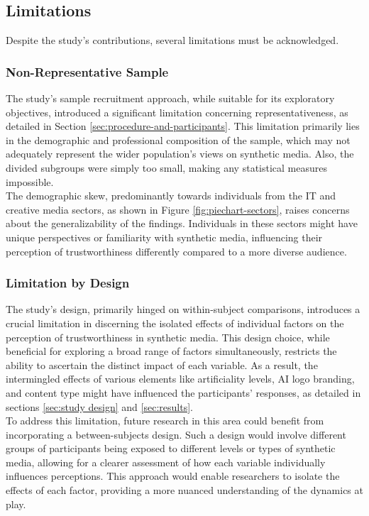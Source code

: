 \documentclass[
  a4paper,  %
  twoside,  %
  bibliography=totoc,
  headsepline,
  cleardoublepage=empty,
  parskip=half,
  draft=false
]{scrbook}
\begin{document}
\subsection{Limitations}
\label{subsec:limitations}
Despite the study's contributions, several limitations must be acknowledged.

\subsubsection{Non-Representative Sample}
The study's sample recruitment approach, while suitable for its exploratory objectives, introduced a significant limitation concerning representativeness, as detailed in Section \ref{sec:procedure-and-participants}. This limitation primarily lies in the demographic and professional composition of the sample, which may not adequately represent the wider population's views on synthetic media. Also, the divided subgroups were simply too small, making any statistical measures impossible. \\
The demographic skew, predominantly towards individuals from the IT and creative media sectors, as shown in Figure \ref{fig:piechart-sectors}, raises concerns about the generalizability of the findings. Individuals in these sectors might have unique perspectives or familiarity with synthetic media, influencing their perception of trustworthiness differently compared to a more diverse audience.

\subsubsection{Limitation by Design}
The study's design, primarily hinged on within-subject comparisons, introduces a crucial limitation in discerning the isolated effects of individual factors on the perception of trustworthiness in synthetic media. This design choice, while beneficial for exploring a broad range of factors simultaneously, restricts the ability to ascertain the distinct impact of each variable. As a result, the intermingled effects of various elements like artificiality levels, AI logo branding, and content type might have influenced the participants' responses, as detailed in sections \ref{sec:study design} and \ref{sec:results}. \\
To address this limitation, future research in this area could benefit from incorporating a between-subjects design. Such a design would involve different groups of participants being exposed to different levels or types of synthetic media, allowing for a clearer assessment of how each variable individually influences perceptions. This approach would enable researchers to isolate the effects of each factor, providing a more nuanced understanding of the dynamics at play.
\end{document}
